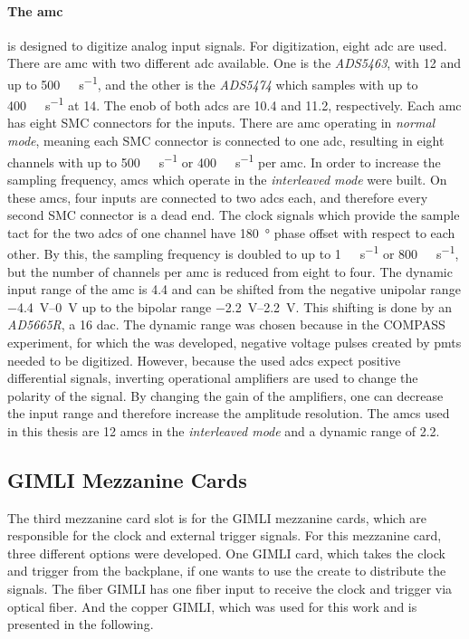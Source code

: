 \paragraph{The \ac{amc}} is designed to digitize analog input signals.
For digitization, eight \ac{adc} are used.
There are \ac{amc} with two different \ac{adc} available.
One is the \textit{ADS5463}, with \SI{12}{\bit} and up to \SI{500}{\mega\sample\per\second}, and the other is the \textit{ADS5474} which samples with up to \SI{400}{\mega\sample\per\second} at \SI{14}{\bit}.
The \ac{enob} of both \acp{adc} are \SI{10.4}{\bit} and \SI{11.2}{\bit}, respectively.
Each \ac{amc} has eight SMC connectors for the inputs.
There are \ac{amc} operating in \textit{normal mode}, meaning each SMC connector is connected to one \ac{adc}, resulting in eight channels with up to \SI{500}{\mega\sample\per\second} or \SI{400}{\mega\sample\per\second} per \ac{amc}.
In order to increase the sampling frequency, \acp{amc} which operate in the \textit{interleaved mode} were built.
On these \acp{amc}, four inputs are connected to two \ac{adc}s each, and therefore every second SMC connector is a dead end.
The clock signals which provide the sample tact for the two \acp{adc} of one channel have \SI{180}{\degree} phase offset with respect to each other.
By this, the sampling frequency is doubled to up to \SI{1}{\giga\sample\per\second} or \SI{800}{\mega\sample\per\second}, but the number of channels per \ac{amc} is reduced from eight to four.
The dynamic input range of the \ac{amc} is \SI{4.4}{\vpp} and can be shifted from the negative unipolar range \SIrange{-4.4}{0}{\volt} up to the bipolar range \SIrange{-2.2}{2.2}{\volt}.
This shifting is done by an \textit{AD5665R}, a \SI{16}{\bit} \ac{dac}.
The dynamic range was chosen because in the COMPASS experiment, for which the  was developed, negative voltage pulses created by \acp{pmt} needed to be digitized.
However, because the used \acp{adc} expect positive differential signals, inverting operational amplifiers are used to change the polarity of the signal.
By changing the gain of the amplifiers, one can decrease the input range and therefore increase the amplitude resolution.
The \acp{amc} used in this thesis are \SI{12}{\bit} \acp{amc} in the \textit{interleaved mode} and a dynamic range of \SI{2.2}{\vpp}.


\subsection{GIMLI Mezzanine Cards}
The third mezzanine card slot is for the GIMLI mezzanine cards, which are responsible for the clock and external trigger signals.
For this mezzanine card, three different options were developed.
One GIMLI card, which takes the clock and trigger from the backplane, if one wants to use the create to distribute the signals.
The fiber GIMLI has one fiber input to receive the clock and trigger via optical fiber.
And the copper GIMLI, which was used for this work and is presented in the following.


